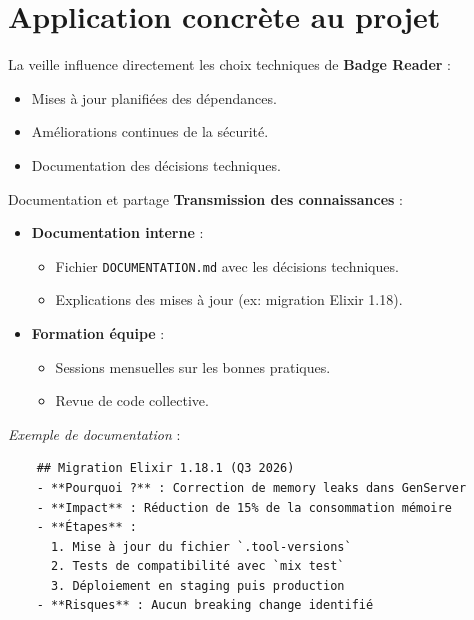 \section{Application concrète au projet}
La veille influence directement les choix techniques de \textbf{Badge Reader} :
\begin{itemize}
    \item Mises à jour planifiées des dépendances.
    \item Améliorations continues de la sécurité.
    \item Documentation des décisions techniques.
\end{itemize}

\begin{for_you}{Documentation et partage}
    \textbf{Transmission des connaissances} :
    \begin{itemize}
        \item \textbf{Documentation interne} :
              \begin{itemize}
                  \item Fichier \texttt{DOCUMENTATION.md} avec les décisions techniques.
                  \item Explications des mises à jour (ex: migration Elixir 1.18).
              \end{itemize}
        \item \textbf{Formation équipe} :
              \begin{itemize}
                  \item Sessions mensuelles sur les bonnes pratiques.
                  \item Revue de code collective.
              \end{itemize}
    \end{itemize}

    \textit{Exemple de documentation} :
    \begin{verbatim}
    ## Migration Elixir 1.18.1 (Q3 2026)
    - **Pourquoi ?** : Correction de memory leaks dans GenServer
    - **Impact** : Réduction de 15% de la consommation mémoire
    - **Étapes** :
      1. Mise à jour du fichier `.tool-versions`
      2. Tests de compatibilité avec `mix test`
      3. Déploiement en staging puis production
    - **Risques** : Aucun breaking change identifié
    \end{verbatim}
\end{for_you}

